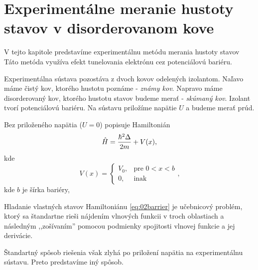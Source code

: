 \section {Experimentálne meranie hustoty stavov v disorderovanom kove}
V tejto kapitole predstavíme experimentálnu metódu merania hustoty stavov
Táto metóda využíva efekt tunelovania elektrónu cez potenciálovú bariéru.

Experimentálna sústava pozostáva z dvoch kovov odelených izolantom. Naľavo máme čistý 
kov, ktorého hustotu poznáme - {\it známy kov}. Napravo máme disorderovaný kov, ktorého 
hustotu stavov budeme merať - {\it skúmaný kov}. Izolant tvorí potenciálovú bariéru.
Na sústavu priložíme napätie  $U$ a budeme merať prúd.  

Bez priloženého napätia ($U=0$) popisuje Hamiltonián 
\begin{equation}
 \label{eq:02barrier}
 \hat{H}=\frac{\hbar^2 \Delta }{2m}+V(x) \text{,}
\end{equation} 
kde 
\begin{equation}
 \label{eq:02potential_barrier}
 V(x)=
 \begin{cases}
    V_0,& \text{pre } 0<x<b\\
    0,              & \text{inak}
\end{cases}\text{,}
\end{equation} 
kde $b$ je šírka bariéry,

Hladanie vlastných stavov Hamiltoniánu \eqref{eq:02barrier} je učebnicový problém, ktorý sa 
štandartne rieši nájdením vlnových funkcii v troch oblastiach a následným ,,zošívaním'' 
pomocou podmienky spojitosti vlnovej funkcie a jej derivácie. 

Štandartný spôsob riešenia však zlyhá po priložení napätia na experimentálnu sústavu. 
Preto predstavíme iný spôsob.

